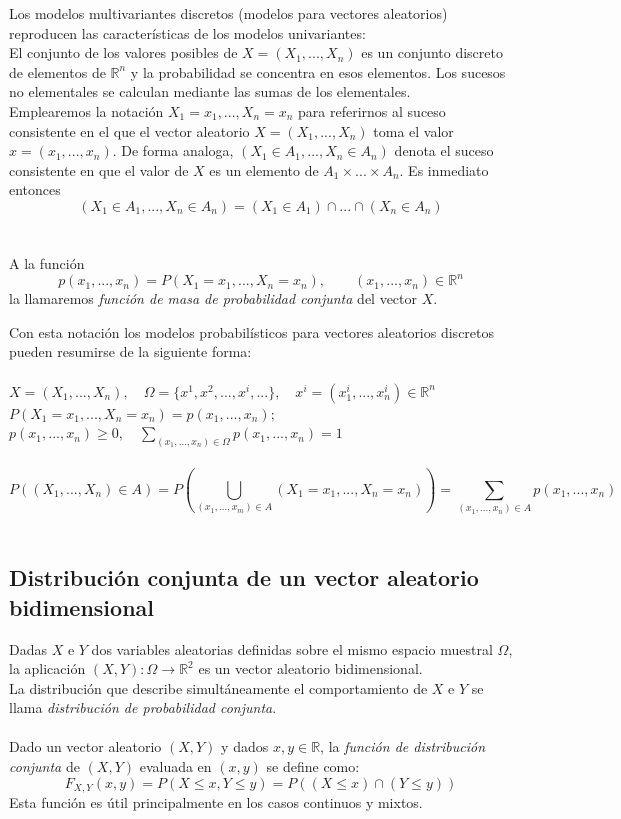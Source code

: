 Los modelos multivariantes discretos (modelos para vectores aleatorios) reproducen las
características de los modelos univariantes: \\
El conjunto de los valores posibles de \(X = (X_1,...,X_n)\) es un conjunto discreto
de elementos de \(\mathbb{R}^n\) y la probabilidad se concentra en esos elementos. Los
sucesos no elementales se calculan mediante las sumas de los elementales. \\
Emplearemos la notación \(X_1 = x_1, ...,  X_n = x_n\) para referirnos al suceso 
consistente en el que el vector aleatorio \(X = (X_1, ...,X_n)\) toma el valor 
\(x = (x_1, ..., x_n)\). De forma analoga, \((X_1 \in A_1, ..., X_n \in A_n)\) denota
el suceso consistente en que el valor de \(X\) es un elemento de \(A_1 \times ... \times A_n\). Es inmediato entonces
\[(X_1 \in A_1, ..., X_n \in A_n) = (X_1 \in A_1) \cap ... \cap (X_n \in A_n)\] \\
\\
A la función 
\[p(x_1, ..., x_n) = P(X_1 = x_1, ..., X_n = x_n), \qquad (x_1, ..., x_n) \in \mathbb{R}^n\]
la llamaremos \textit{función de masa de probabilidad conjunta} del vector \(X\).

\newpage

Con esta notación los modelos probabilísticos para vectores aleatorios discretos pueden
resumirse de la siguiente forma: \\ \\
\(X = (X_1, ..., X_n), \quad \Omega = \{ x^1, x^2, ..., x^i, ... \}, \quad x^i = (x^i_1, ..., x^i_n) \in \mathbb{R}^n\) \\
\(P(X_1 = x_1, ..., X_n = x_n) = p(x_1, ..., x_n);\) \\
\(p(x_1, ..., x_n) \geq 0, \quad \displaystyle\sum_{(x_1, ..., x_n) \in \Omega} p(x_1, ..., x_n) = 1\) \\ \\
\[P((X_1, ..., X_n) \in A) = P\left( \displaystyle\bigcup_{(x_1, ..., x_m) \in A} (X_1 = x_1, ..., X_n = x_n) \right) = \displaystyle\sum_{(x_1, ..., x_n) \in A} p(x_1, ..., x_n)\] \\

\subsection{Distribución conjunta de un vector aleatorio bidimensional}

Dadas \(X\) e \(Y\) dos variables aleatorias definidas sobre el mismo espacio muestral
\(\Omega\), la \qquad aplicación \((X,Y):\Omega \to \mathbb{R}^2\) es un vector
aleatorio bidimensional. \\
La distribución que describe simultáneamente el comportamiento de \(X\) e \(Y\) se 
llama \textit{distribución de probabilidad conjunta}. \\ \\
Dado un vector aleatorio \((X, Y)\) y dados \(x,y \in \mathbb{R}\), la \textit{función
de distribución conjunta} de \((X, Y)\) evaluada en \((x, y)\) se define como:
\[F_{X, Y}(x, y) = P(X \leq x, Y \leq y) = P((X \leq x) \cap (Y \leq y))\]
Esta función es útil principalmente en los casos continuos y mixtos.

